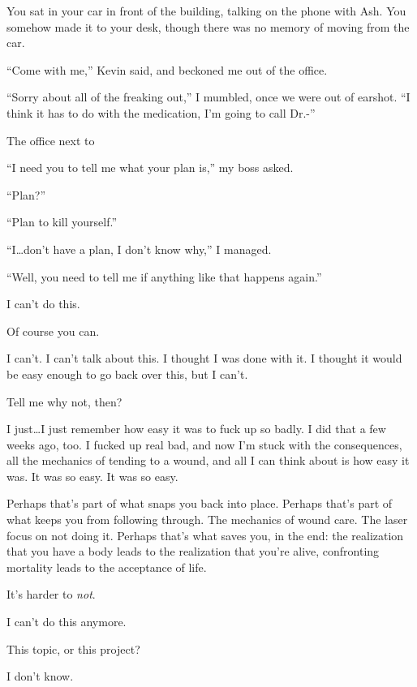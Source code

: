 \begin{paracol}{2}
\begin{leftcolumn}
\begin{ally}
You sat in your car in front of the building, talking on the phone with Ash. You somehow made it to your desk, though there was no memory of moving from the car.
\end{ally}
``Come with me,'' Kevin said, and beckoned me out of the office.

``Sorry about all of the freaking out,'' I mumbled, once we were out of earshot. ``I think it has to do with the medication, I'm going to call Dr.-''

\begin{ally}
The office next to
\end{ally}
``I need you to tell me what your plan is,'' my boss asked.

``Plan?''

``Plan to kill yourself.''

``I\ldots{}don't have a plan, I don't know why,'' I managed.

``Well, you need to tell me if anything like that happens again.''
\newpage

\noindent I can't do this.

\begin{ally}
Of course you can.
\end{ally}
I can't. I can't talk about this. I thought I was done with it. I thought it would be easy enough to go back over this, but I can't.

\begin{ally}
Tell me why not, then?
\end{ally}
I just\ldots{}I just remember how easy it was to fuck up so badly. I did that a few weeks ago, too. I fucked up real bad, and now I'm stuck with the consequences, all the mechanics of tending to a wound, and all I can think about is how easy it was. It was so easy. It was so easy.

\begin{ally}
Perhaps that's part of what snaps you back into place. Perhaps that's part of what keeps you from following through. The mechanics of wound care. The laser focus on not doing it. Perhaps that's what saves you, in the end: the realization that you have a body leads to the realization that you're alive, confronting mortality leads to the acceptance of life.
\end{ally}
It's harder to \emph{not}.
\newpage

\noindent I can't do this anymore.

\begin{ally}
This topic, or this project?
\end{ally}
I don't know.
\newpage


\end{leftcolumn}
\end{paracol}
